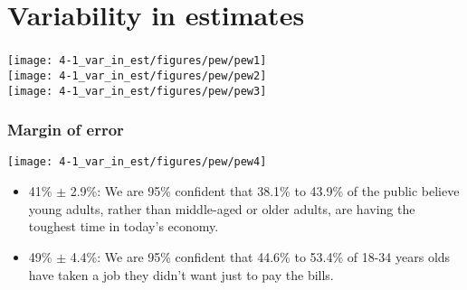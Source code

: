 \section{Variability in estimates}


\begin{frame}
\frametitle{}

\begin{center}
\texttt{[image: 4-1\_var\_in\_est/figures/pew/pew1]} \\
\texttt{[image: 4-1\_var\_in\_est/figures/pew/pew2]} \\
\texttt{[image: 4-1\_var\_in\_est/figures/pew/pew3]}
\end{center}


\end{frame}


\begin{frame}
\frametitle{Margin of error}

\begin{center}
\texttt{[image: 4-1\_var\_in\_est/figures/pew/pew4]}
\end{center}

\begin{itemize}

\item 41\% $\pm$ 2.9\%: We are 95\% confident that 38.1\% to 43.9\% of the public believe young adults, rather than middle-aged or older adults, are having the toughest time in today's economy.


\item 49\% $\pm$ 4.4\%: We are 95\% confident that 44.6\% to 53.4\% of 18-34 years olds have taken a job they didn't want just to pay the bills.

\end{itemize}

\end{frame}


